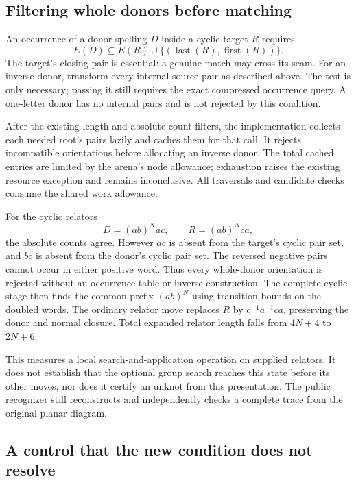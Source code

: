 \subsection{Filtering whole donors before matching}

An occurrence of a donor spelling $D$ inside a cyclic target $R$ requires
\[
 E(D)\subseteq E(R)\cup\{(\operatorname{last}(R),
                              \operatorname{first}(R))\}.
\]
The target's closing pair is essential: a genuine match may cross its seam.
For an inverse donor, transform every internal source pair as described
above. The test is only necessary; passing it still requires the exact
compressed occurrence query. A one-letter donor has no internal pairs
and is not rejected by this condition.

After the existing length and absolute-count filters, the implementation
collects each needed root's pairs lazily and caches them for that call.
It rejects incompatible orientations before allocating an inverse donor.
The total cached entries are limited by the arena's node allowance;
exhaustion raises the existing resource exception and remains inconclusive.
All traversals and candidate checks consume the shared work allowance.

For the cyclic relators
\[
 D=(ab)^Nac,\qquad R=(ab)^Nca,
\]
the absolute counts agree. However $ac$ is absent from the target's cyclic
pair set, and $bc$ is absent from the donor's cyclic pair set. The reversed
negative pairs cannot occur in either positive word. Thus every whole-donor
orientation is rejected without an occurrence table or inverse construction.
The complete cyclic stage then finds the common prefix $(ab)^N$ using
transition bounds on the doubled words. The ordinary relator move replaces
$R$ by $c^{-1}a^{-1}ca$, preserving the donor and normal closure. Total
expanded relator length falls from $4N+4$ to $2N+6$.

This measures a local search-and-application operation on supplied relators.
It does not establish that the optional group search reaches this state
before its other moves, nor does it certify an unknot from this presentation.
The public recognizer still reconstructs and independently checks a complete
trace from the original planar diagram.

\subsection{A control that the new condition does not resolve}

